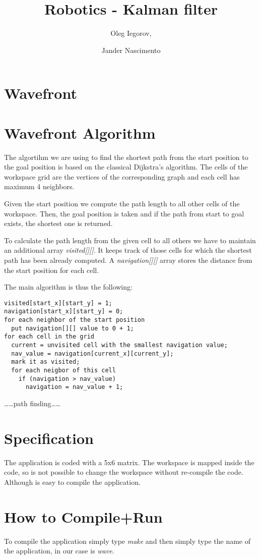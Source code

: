 \documentclass{article}
\begin{document}
\title{Robotics - Kalman filter}

\author{Oleg Iegorov, 
\and Jander Nascimento}

\maketitle

\section{Wavefront}


\section{Wavefront Algorithm}

The algortihm we are using to find the shortest path from the start
position to the goal position is based on the classical Dijkstra's
algorithm. The cells of the workspace grid are the vertices of the
corresponding graph and each cell has maximum 4 neighbors.

Given the start position we compute the path length to all other cells
of the workspace. Then, the goal position is taken and if the path from
start to goal exists, the shortest one is returned.

To calculate the path length from the given cell to all others we have
to maintain an additional array \emph{visited[][]}. It keeps track of
those cells for which the shortest path has been already computed.  A
\emph{navigation[][]} array stores the distance from the start position for
each cell.

The main algorithm is thus the following:

\begin{lstlisting}
visited[start_x][start_y] = 1;
navigation[start_x][start_y] = 0;
for each neighbor of the start position
  put navigation[][] value to 0 + 1;
for each cell in the grid
  current = unvisited cell with the smallest navigation value;
  nav_value = navigation[current_x][current_y];
  mark it as visited;
  for each neigbor of this cell
    if (navigation > nav_value)
      navigation = nav_value + 1;
\end{lstlisting}


\dots\dots path finding\dots\dots

\section{Specification}

The application is coded with a 5x6 matrix. The workspace is mapped inside the code, so is not possible to change the workspace without re-compile the code. Although is easy to compile the application.

\section{How to Compile+Run}

To compile the application simply type {\it make} and then simply type the name of the application, in our case is \emph{wave}.
\end{document}
